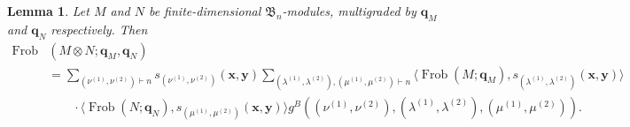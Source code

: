 \documentclass[12pt]{amsart}
\theoremstyle{plain}
\newtheorem{lemma}[theorem]{Lemma}
\theoremstyle{definition}
\DeclareMathOperator{\Frob}{Frob}
\newcommand{\x}{\mathbf{x}}
\newcommand{\y}{\mathbf{y}}
\begin{document}
\begin{lemma}\label{lem:Bessenrodt-typeB}
Let $M$ and $N$ be finite-dimensional $\mathfrak{B}_n$-modules, multigraded by $\mathbf{q}_M$ and $\mathbf{q}_N$ respectively. 
Then
\begin{equation}\begin{aligned}
    \Frob&(M \otimes N; \mathbf{q}_M,\mathbf{q}_N)\\  &= \sum_{(\nu^{(1)},\nu^{(2)}) \vdash n} s_{(\nu^{(1)},\nu^{(2)})}(\x,\y) \sum_{(\lambda^{(1)},\lambda^{(2)}), (\mu^{(1)},\mu^{(2)}) \vdash n} \langle \Frob(M; \mathbf{q}_M), s_{(\lambda^{(1)},\lambda^{(2)})} (\x,\y)\rangle\\
    &\qquad \cdot\langle \Frob(N; \mathbf{q}_N), s_{(\mu^{(1)},\mu^{(2)})} (\x,\y) \rangle g^B((\nu^{(1)},\nu^{(2)}), (\lambda^{(1)},\lambda^{(2)}), (\mu^{(1)},\mu^{(2)})).
\end{aligned}\end{equation}
\end{lemma}
\end{document}
